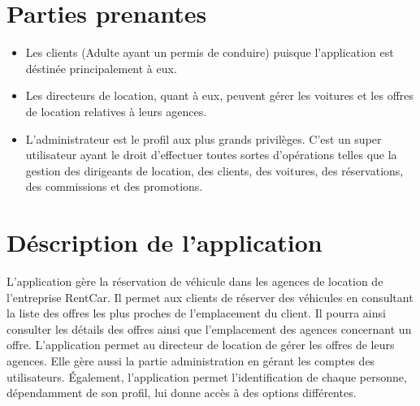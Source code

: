 \documentclass[12pt,a4paper]{report}
\begin{document}
		\section{Parties prenantes}
			\begin{itemize}
				\item Les clients (Adulte ayant un permis de conduire) puisque l'application est déstinée principalement à eux.
				\item Les directeurs de location, quant à eux, peuvent gérer les voitures et les offres de location relatives à leurs agences.
				\item L'administrateur est le profil aux plus grands privilèges. C'est un super utilisateur ayant le droit d'effectuer toutes sortes d'opérations telles que la gestion des dirigeants de location, des clients, des voitures, des réservations, des commissions et des promotions.
			\end{itemize}
		


		\section{Déscription de l'application}
L’application gère la réservation de véhicule dans les agences de location de l’entreprise RentCar. Il permet aux clients de réserver des véhicules en consultant la liste des offres les plus proches de l’emplacement du client. Il pourra ainsi consulter les détails des offres ainsi que l’emplacement des agences concernant un offre.
L’application permet au directeur de location de gérer les offres de leurs agences. Elle gère aussi la partie administration en gérant les comptes des utilisateurs. 
Également, l’application permet l’identification de chaque personne, dépendamment de son profil, lui donne accès à des options différentes.



\end{document}
